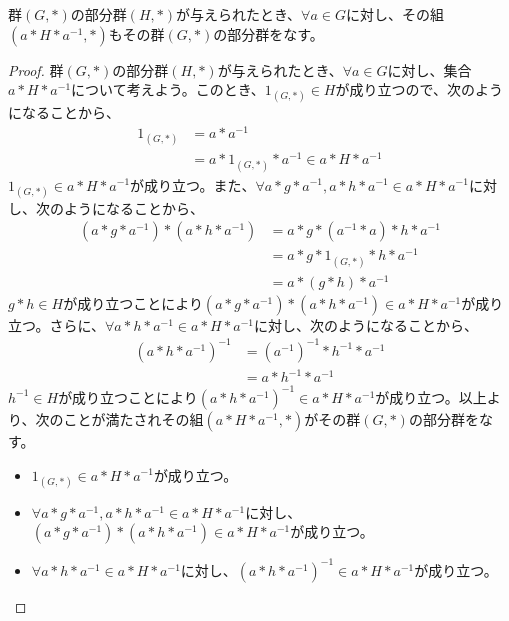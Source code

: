 \documentclass[dvipdfmx]{jsarticle}
\begin{document}
\begin{dfn}
\begin{thm}\label{3.1.1.23}
群$(G,*)$の部分群$(H,*)$が与えられたとき、$\forall a \in G$に対し、その組$\left( a*H*a^{- 1},* \right)$もその群$(G,*)$の部分群をなす。
\end{thm}
\begin{proof}
群$(G,*)$の部分群$(H,*)$が与えられたとき、$\forall a \in G$に対し、集合$a*H*a^{- 1}$について考えよう。このとき、$1_{(G,*)} \in H$が成り立つので、次のようになることから、
\begin{align*}
1_{(G,*)} &= a*a^{- 1}\\
&= a*1_{(G,*)}*a^{- 1} \in a*H*a^{- 1}
\end{align*}
$1_{(G,*)} \in a*H*a^{- 1}$が成り立つ。また、$\forall a*g*a^{- 1},a*h*a^{- 1} \in a*H*a^{- 1}$に対し、次のようになることから、
\begin{align*}
\left( a*g*a^{- 1} \right)*\left( a*h*a^{- 1} \right) &= a*g*\left( a^{- 1}*a \right)*h*a^{- 1}\\
&= a*g*1_{(G,*)}*h*a^{- 1}\\
&= a*(g*h)*a^{- 1}
\end{align*}
$g*h \in H$が成り立つことにより$\left( a*g*a^{- 1} \right)*\left( a*h*a^{- 1} \right) \in a*H*a^{- 1}$が成り立つ。さらに、$\forall a*h*a^{- 1} \in a*H*a^{- 1}$に対し、次のようになることから、
\begin{align*}
\left( a*h*a^{- 1} \right)^{- 1} &= \left( a^{- 1} \right)^{- 1}*h^{- 1}*a^{- 1}\\
&= a*h^{- 1}*a^{- 1}
\end{align*}
$h^{- 1} \in H$が成り立つことにより$\left( a*h*a^{- 1} \right)^{- 1} \in a*H*a^{- 1}$が成り立つ。以上より、次のことが満たされその組$\left( a*H*a^{- 1},* \right)$がその群$(G,*)$の部分群をなす。
\begin{itemize}
\item
  $1_{(G,*)} \in a*H*a^{- 1}$が成り立つ。
\item
  $\forall a*g*a^{- 1},a*h*a^{- 1} \in a*H*a^{- 1}$に対し、$\left( a*g*a^{- 1} \right)*\left( a*h*a^{- 1} \right) \in a*H*a^{- 1}$が成り立つ。
\item
  $\forall a*h*a^{- 1} \in a*H*a^{- 1}$に対し、$\left( a*h*a^{- 1} \right)^{- 1} \in a*H*a^{- 1}$が成り立つ。
\end{itemize}
\end{proof}

\end{dfn}
\end{document}
